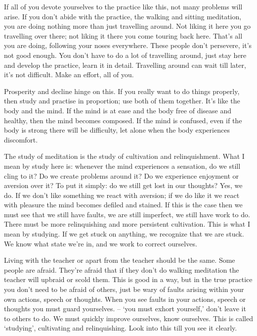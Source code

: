 If all of you devote yourselves to the practice like this, not many problems will arise. If you don't abide with the practice, the walking and sitting meditation, you are doing nothing more than just travelling around. Not liking it here you go travelling over there; not liking it there you come touring back here. That's all you are doing, following your noses everywhere. These people don't persevere, it's not good enough. You don't have to do a lot of travelling around, just stay here and develop the practice, learn it in detail. Travelling around can wait till later, it's not difficult. Make an effort, all of you.

Prosperity and decline hinge on this. If you really want to do things properly, then study and practise in proportion; use both of them together. It's like the body and the mind. If the mind is at ease and the body free of disease and healthy, then the mind becomes composed. If the mind is confused, even if the body is strong there will be difficulty, let alone when the body experiences discomfort.

The study of meditation is the study of cultivation and relinquishment. What I mean by study here is: whenever the mind experiences a sensation, do we still cling to it? Do we create problems around it? Do we experience enjoyment or aversion over it? To put it simply: do we still get lost in our thoughts? Yes, we do. If we don't like something we react with aversion; if we do like it we react with pleasure the mind becomes defiled and stained. If this is the case then we must see that we still have faults, we are still imperfect, we still have work to do. There must be more relinquishing and more persistent cultivation. This is what I mean by studying. If we get stuck on anything, we recognize that we are stuck. We know what state we're in, and we work to correct ourselves.

Living with the teacher or apart from the teacher should be the same. Some people are afraid. They're afraid that if they don't do walking meditation the teacher will upbraid or scold them. This is good in a way, but in the true practice you don't need to be afraid of others, just be wary of faults arising within your own actions, speech or thoughts. When you see faults in your actions, speech or thoughts you must guard yourselves.  -- `you must exhort yourself,' don't leave it to others to do. We must quickly improve ourselves, know ourselves. This is called `studying', cultivating and relinquishing. Look into this till you see it clearly.

